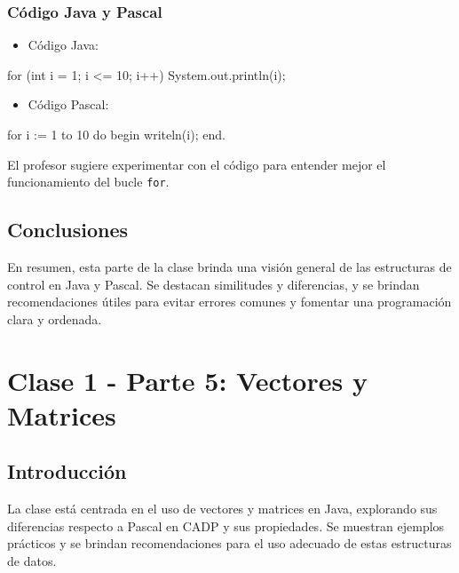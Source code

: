 \documentclass[a4paper]{report}
\begin{document}
\subsection{Código Java y Pascal}

\begin{itemize}
    \item Código Java:
\end{itemize}

\begin{roundedlst}
for (int i = 1; i <= 10; i++) {
    System.out.println(i);
}
\end{roundedlst}

\begin{itemize}
    \item Código Pascal:
\end{itemize}

\begin{roundedlst}
for i := 1 to 10 do
begin
  writeln(i);
end.
\end{roundedlst}

El profesor sugiere experimentar con el código para entender mejor el funcionamiento del bucle \texttt{for}.

\section{Conclusiones}
En resumen, esta parte de la clase brinda una visión general de las estructuras de control en Java y Pascal. Se destacan similitudes y diferencias, y se brindan recomendaciones útiles para evitar errores comunes y fomentar una programación clara y ordenada.

\newpage
\maketitle

\chapter{Clase 1 - Parte 5: Vectores y Matrices}
\section{Introducción}

La clase está centrada en el uso de vectores y matrices en Java, explorando sus diferencias respecto a Pascal en CADP y sus propiedades. Se muestran ejemplos prácticos y se brindan recomendaciones para el uso adecuado de estas estructuras de datos.
\end{document}
